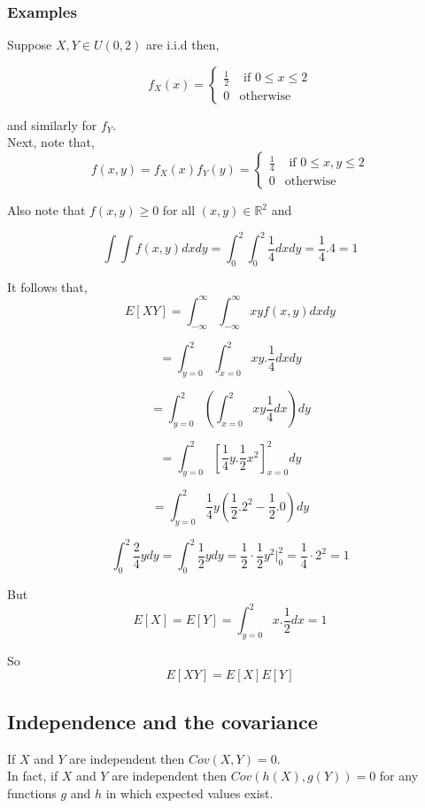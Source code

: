 \documentclass[12pt,a4paper]{article}
\theoremstyle{regla}
\theoremstyle{remark}
\theoremstyle{definition}
\theoremstyle{nonumberbreak}
\begin{document}
\subsubsection{Examples}
\begin{xmpl}
Suppose $X,Y \in U (0,2)$ are  i.i.d then,

$$
f_X (x) =  \left \{ \begin{array}{rl}
\frac {1}{2} &\mbox { if $0 \leq x \leq 2$} \\
0 &\mbox {otherwise}
\end{array} \right.
$$

and similarly for $f_Y$.\\

Next, note that,
$$
f(x,y) =  f_X (x) f_Y (y) = \left \{ \begin{array}{rl}
\frac {1}{4} &\mbox { if $0 \leq x,y \leq 2 $} \\
0 &\mbox {otherwise}
\end{array} \right.
$$

Also note that $f(x,y) \geq 0$ for all $ (x,y) \in \mathbb{R}^2 $ and 

$$\int\int  f(x,y)dxdy = \int_{0}^{2}\int_{0}^{2} \frac {1}{4} dxdy =  \frac {1}{4}.4 = 1$$

It follows that,
$$ E [X Y] = \int_{-\infty}^{\infty}\int_{-\infty}^{\infty} xy f(x,y) dxdy$$

$$ = \int_{y=0}^{2}\int_{x=0}^{2} xy. \frac {1}{4}dxdy $$

$$ = \int_{y=0}^{2} (\int_{x=0}^{2} xy \frac {1}{4} dx) dy$$

$$= \int_{y=0}^{2} [\frac {1}{4}y. \frac {1}{2}x^2]_{x=0}^ {2} dy $$

 

$$ = \int_{y=0}^{2} \frac {1}{4}y (\frac {1}{2}.2^2 - \frac {1}{2}.0) dy$$

$$ \int_{0}^{2} \frac {2}{4}y dy = \int_{0}^{2} \frac {1}{2}y dy = \frac {1}{2}\cdot \frac {1}{2} y^2 | _{0}^2 = \frac {1}{4}\cdot 2^2 = 1 $$

But $$ E [X] = E[Y] = \int_{y=0}^{2} x. \frac {1}{2} dx = 1$$

So $$E[XY] = E [X] E[Y] $$

\end{xmpl}




\subsection{Independence and the covariance}
\begin{fbox}
\begin{minipage}{0.97\textwidth}
If $X$ and $Y$ are independent then $Cov(X,Y)=0$.\\

In fact, if $X$ and $Y$ are independent then $Cov(h(X),g(Y))=0$ for any functions $g$ and $h$ in which expected values exist.

\end{minipage}
\end{fbox}
\end{document}
